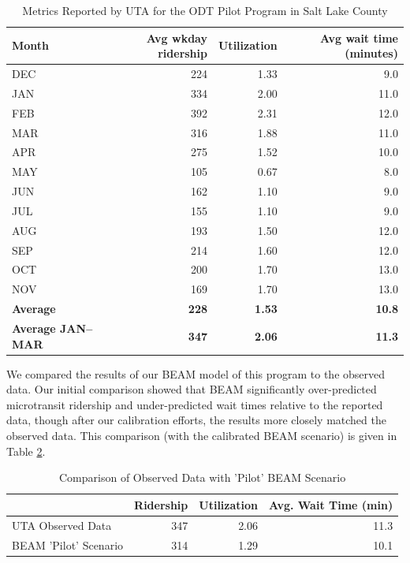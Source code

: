 \documentclass[
]{report}
\begin{document}
\begin{table}

\caption{\label{tab:uta-metrics}Metrics Reported by UTA for the ODT Pilot Program in Salt Lake County}
\centering
\begin{tabular}[t]{lrrr}
\toprule
Month & Avg wkday ridership & Utilization & Avg wait time (minutes)\\
\midrule
DEC & 224 & 1.33 & 9.0\\
JAN & 334 & 2.00 & 11.0\\
FEB & 392 & 2.31 & 12.0\\
MAR & 316 & 1.88 & 11.0\\
APR & 275 & 1.52 & 10.0\\
MAY & 105 & 0.67 & 8.0\\
JUN & 162 & 1.10 & 9.0\\
JUL & 155 & 1.10 & 9.0\\
AUG & 193 & 1.50 & 12.0\\
SEP & 214 & 1.60 & 12.0\\
OCT & 200 & 1.70 & 13.0\\
NOV & 169 & 1.70 & 13.0\\
\textbf{Average} & \textbf{228} & \textbf{1.53} & \textbf{10.8}\\
\addlinespace
\textbf{Average JAN--MAR} & \textbf{347} & \textbf{2.06} & \textbf{11.3}\\
\bottomrule
\end{tabular}
\end{table}

We compared the results of our BEAM model of this program to the observed data. Our initial comparison showed that BEAM significantly over-predicted microtransit ridership and under-predicted wait times relative to the reported data, though after our calibration efforts, the results more closely matched the observed data. This comparison (with the calibrated BEAM scenario) is given in Table \ref{tab:existing-comparison}.

\begin{table}

\caption{\label{tab:existing-comparison}Comparison of Observed Data with 'Pilot' BEAM Scenario}
\centering
\begin{tabular}[t]{lrrr}
\toprule
  & Ridership & Utilization & Avg. Wait Time (min)\\
\midrule
UTA Observed Data & 347 & 2.06 & 11.3\\
BEAM 'Pilot' Scenario & 314 & 1.29 & 10.1\\
\bottomrule
\end{tabular}
\end{table}
\end{document}
